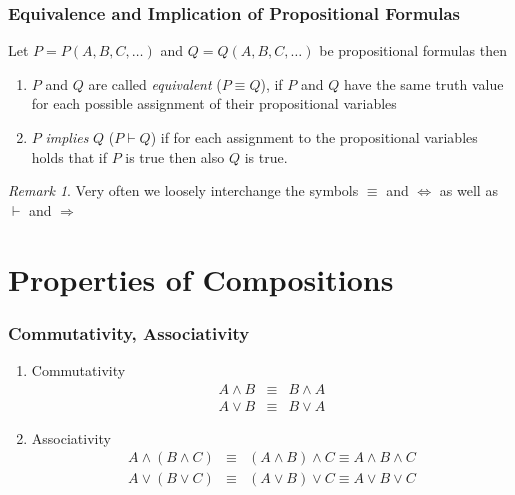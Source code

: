 \documentclass{beamer}
\theoremstyle{remark}
\newtheorem{remark}[theorem]{Remark}
\begin{document}
\begin{frame}
\frametitle{Equivalence and Implication of Propositional Formulas}
\begin{definition}
Let $P = P(A, B, C, \ldots)$ and $Q = Q(A, B, C, \ldots)$ be propositional formulas then
\begin{enumerate}
	\item $P$ and $Q$ are called {\em equivalent} ($P \equiv Q$), if $P$ and $Q$ have the same truth value for each possible assignment of their propositional variables
	\pause
	\item $P$ {\em implies} $Q$ ($P \vdash Q$) if for each assignment to the propositional variables holds that if $P$ is true then also $Q$ is true.
\end{enumerate}
\end{definition}
\pause
\begin{remark}
Very often we loosely interchange the symbols $\equiv$ and $\Leftrightarrow$ as well as $\vdash$ and $\Rightarrow$
\end{remark}
\end{frame}

\section{Properties of Compositions}
\begin{frame}
\frametitle{Commutativity, Associativity}
\begin{theorem}
\begin{enumerate}
	\item Commutativity	\begin{eqnarray*}
						A \land B &\equiv &B \land A \\
						A \lor B &\equiv & B \lor A
					\end{eqnarray*}
	\pause
	\item Associativity	\begin{eqnarray*}
						A \land (B \land C) & \equiv & (A \land B) \land C \equiv A \land B \land C \\
						A \lor (B \lor C) & \equiv & (A \lor B) \lor C \equiv A \lor B \lor C 
					\end{eqnarray*}
\end{enumerate}
\end{theorem}
\end{frame}
\end{document}
